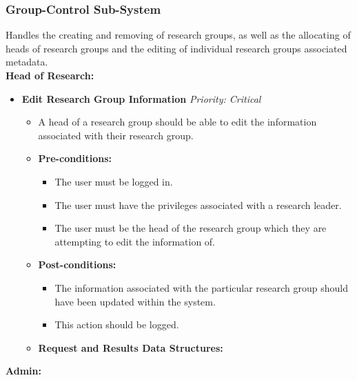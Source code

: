 \documentclass{article}
\begin{document}
			\subsubsection{Group-Control Sub-System}\label{subsubsec:group}
				Handles the creating and removing of research groups, as well as the allocating of heads of research groups and the editing of individual research groups associated metadata.\\
				[3mm]
				\textbf{Head of Research:}
				\begin{itemize}
					\item \textbf{Edit Research Group Information} \hfill \textit{Priority: Critical}
					\begin{itemize}
						\item A head of a research group should be able to edit the information associated with their research group.
						\item \textbf{Pre-conditions:}
						\begin{itemize}
							\item The user must be logged in.
							\item The user must have the privileges associated with a research leader.
							\item The user must be the head of the research group which they are attempting to edit the information of.
						\end{itemize}
						\item \textbf{Post-conditions:}
						\begin{itemize}
							\item The information associated with the particular research group should have been updated within the system.
							\item This action should be logged.
						\end{itemize}
						\item \textbf{Request and Results Data Structures:}
					\end{itemize}
				\end{itemize}
				\textbf{Admin:}
\end{document}
